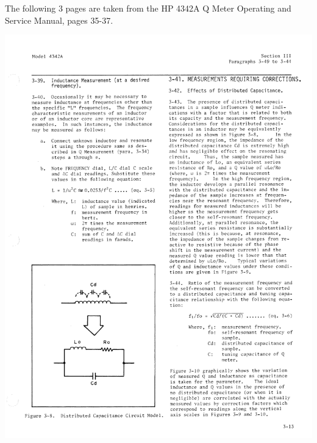 \documentclass[titlepage, letterpaper, 10.5pt]{article}
\begin{document}
The following 3 pages are taken from the HP 4342A Q Meter Operating
and Service Manual, pages 35-37.

\clearpage
\includegraphics[width=1\textwidth]{qMeter/page35}
\end{document}
